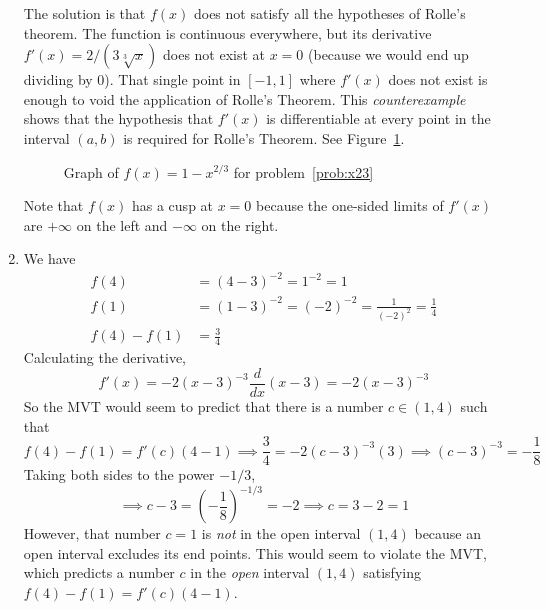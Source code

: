 \documentclass{article}
\begin{document}
\begin{enumerate}
  The solution is that $f(x)$ does not satisfy all the hypotheses of Rolle's
  theorem.  The function is continuous everywhere, but its derivative
  $f'(x)=2/(3\sqrt[3]{x})$ does not exist at $x=0$ (because we would end up
  dividing by $0$).  That single point in $[-1,1]$ where $f'(x)$ does not
  exist is enough to void the application of Rolle's Theorem.  This
  \textit{counterexample} shows that the hypothesis that $f'(x)$ is
  differentiable at every point in the interval $(a,b)$ is required for Rolle's
  Theorem.  See Figure~\ref{fig:x23}.
  \begin{figure}[htbp]
    \centering
    \caption{Graph of $f(x)=1-x^{2/3}$ for problem~\ref{prob:x23}}
    \label{fig:x23}
  \end{figure}
  Note that $f(x)$ has a cusp at $x=0$ because the one-sided limits of $f'(x)$
  are $+\infty$ on the left and $-\infty$ on the right.
\item\label{prob:x-3-2} %
  We have
  \begin{align*}
    f(4)      &= (4-3)^{-2} = 1^{-2} = 1 \\
    f(1)      &= (1-3)^{-2} = (-2)^{-2} = \frac{1}{(-2)^2} = \frac{1}{4} \\
    f(4)-f(1) &= \frac{3}{4}
  \end{align*}
  Calculating the derivative,
  \begin{equation*}
    f'(x) = -2(x-3)^{-3} \frac{d}{dx} (x-3) = -2(x-3)^{-3}
  \end{equation*}
  So the MVT would seem to predict that there is a number $c\in(1,4)$ such that
  \begin{equation*}
    f(4)-f(1) = f'(c)(4-1) 
    \implies \frac{3}{4} = -2(c-3)^{-3} (3)
    \implies (c-3)^{-3}=-\frac{1}{8} 
  \end{equation*}
  Taking both sides to the power $-1/3$,
  \begin{equation*}
    \implies c-3=\left(-\frac{1}{8}\right)^{-1/3}=-2
    \implies c=3-2=1
  \end{equation*}
  However, that number $c=1$ is \textit{not} in the open interval $(1,4)$
  because an open interval excludes its end points.  This would seem to 
  violate the MVT, which predicts a number $c$ in the \textit{open} interval
  $(1,4)$ satisfying $f(4)-f(1)=f'(c)(4-1)$.


\end{enumerate}
\end{document}
